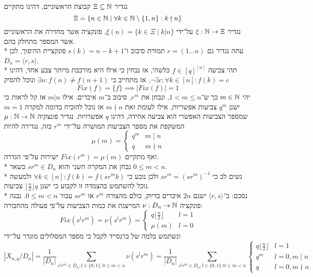 נגדיר $\Xi \subseteq \mathbb{N}$ קבוצת הראשוניים, דהינו מתקיים 
\[
	\Xi = \left\{ n \in \mathbb{N} \mid \forall k \in \mathbb{N}\setminus\{1, n\} : k \nmid n\right\}
\]
נגדיר $\xi : \mathbb{N} \to \Xi$ על־ידי $\xi(n) = \{ k \in \Xi \mid k | n \}$, פונקציה אשר מחזירה את הראשוניים אשר המספר מתחלק בהם. \\*
עתה נגדיר גם $r = (1 \dots n)$ תמורת סיבוב ו־$s(k) = n - k + 1$ פונקציית ההיפוך, לכן $D_n = \langle r, s \rangle$. \\*
תהי צביעה $f \in {[q]}^{[n]}$ כלשהי, אז נבחין כי אילו היא מורכבת מיותר צבע אחד, דהינו $\lnot \exists c : \forall k \in [n] : f(k) = c$, אז מתחייב כי $\exists n : f(n) \ne f(n + 1)$ ונוכל להסיק
\[
	Fix(f) = \{ f\} \implies |Fix(f)| = 1
\]
יהי $m \in \mathbb{N}$ כך ש־$1 < m \le n$, ונבחן את $r^m$, סיבוב ב־$m$ איברים.
אילו $m \big| n$ אז קל לראות כי ישנן $q^m$ צביעות אפשריות, אילו לעומת זאת $m \nmid n$ אז נוכל להוכיח בדומה למקרה $m = 1$ שמספר הצביעות האפשרי הוא צביעה אחידה, דהינו $q$ אפשרויות.
נגדיר פונצקיה $\mu : \mathbb{N} \to \mathbb{N}$ המשקפת את מספר הצביעות המושרה על־ידי $r^m$ כזה, נגדירה להיות
\[
	\mu(m) = \begin{cases}
		q^m & m \mid n \\
		q & m \nmid n
	\end{cases}
\]
ואף מתקיים $Fix(r^m) = \mu(m)$ ישירות על־פי הגדרה. \\*
נבחן את המקרה השני והוא $s r^m \in D_n$ כשאר $0 \le m < n$. \\*
נשים לב כי $sr^m = {(sr^m)}^{-1}$ ולכן נובע כי $\forall k \in [n] : f(k) = f(sr^m k)$ ולמעשה נוכל להשתמש בהצמדה זו לקבוע כי ישנן $\lfloor \frac{n}{2} \rfloor q$ צביעות. \\*
נסכם:
ב־$\langle r, s \rangle$ ישנם $2n$ איברים בדיוק, כולם מהצורה $r^m$ או $s r^m$ עבור $0 \le m < n$. נבנה פונקציה $\nu : D_n \to \mathbb{N}$ המייצגת את כמות הצביעות על־פי פעולה מהחבורה:
\[
	Fix(s^l r^m) = \nu(s^l r^m) = \begin{cases}
		q \lfloor \frac{n}{2} \rfloor & l = 1 \\
		\mu(m) & l = 0
	\end{cases}
\]
ונשתמש בלמה של ברנסייד לקבל כי מספר המסלולים מוגדר על־ידי
\[
	|X_{n, q} / D_n| = \frac{1}{|D_n|} \sum_{s^l r^m \in D_n, l \in \{0, 1\}, 0 \le m < n} \nu(s^l r^m)
	= \frac{1}{|D_n|} \sum_{s^l r^m \in D_n, l \in \{0, 1\}, 0 \le m < n} \begin{cases}
		q \lfloor \frac{n}{2} \rfloor & l = 1 \\
		q^m & l = 0, m \mid n \\
		q & l = 0, m \nmid n
	\end{cases}
\]



